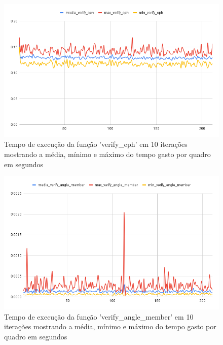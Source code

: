 \begin{figure}[H]
	\centering
	\caption{Tempo de execução da função 'verify\_eph' em 10 iterações mostrando a média, mínimo e máximo do tempo gasto por quadro em segundos}
	\includegraphics[scale=0.5]{figuras/grafico/eph.png}
\end{figure}


\begin{figure}[H]
	\centering
	\caption{Tempo de execução da função 'verify\_angle\_member' em 10 iterações mostrando a média, mínimo e máximo do tempo gasto por quadro em segundos}
	\includegraphics[scale=0.6]{figuras/grafico/angulo.png}
\end{figure}


